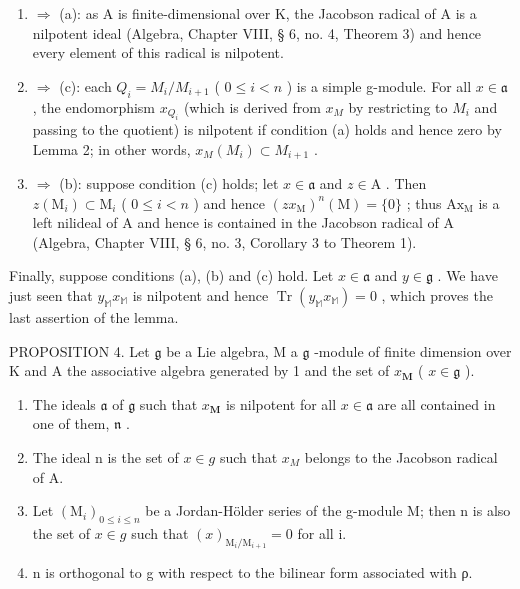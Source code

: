 \begin{enumerate}
\def\labelenumi{(\alph{enumi})}
\setcounter{enumi}{1}
\item
  \(\Rightarrow\) (a): as A is finite-dimensional over K, the Jacobson radical of A is a nilpotent ideal (Algebra, Chapter VIII, § 6, no. 4, Theorem 3) and hence every element of this radical is nilpotent.
\item
  \(\Rightarrow\) (c): each \(Q_{i} = M_{i}/M_{i+1}\) ( \(0 \leqslant i < n\) ) is a simple g-module. For all \(x \in \mathfrak{a}\) , the endomorphism \(x_{Q_{i}}\) (which is derived from \(x_{M}\) by restricting to \(M_{i}\) and passing to the quotient) is nilpotent if condition (a) holds and hence zero by Lemma 2; in other words, \(x_{M}(M_{i}) \subset M_{i+1}\) .
\item
  \(\Rightarrow\) (b): suppose condition (c) holds; let \(x\in\mathfrak{a}\) and \(z\in\mathrm{A}\) . Then \(z(\mathrm{M}_{i})\subset\mathrm{M}_{i}\) ( \(0\leqslant i<n\) ) and hence \((zx_{\mathrm{M}})^{n}(\mathrm{M})=\{0\}\) ; thus \(\mathrm{Ax}_{\mathrm{M}}\) is a left nilideal of A and hence is contained in the Jacobson radical of A (Algebra, Chapter VIII, § 6, no. 3, Corollary 3 to Theorem 1).
\end{enumerate}

Finally, suppose conditions (a), (b) and (c) hold. Let \(x \in \mathfrak{a}\) and \(y \in \mathfrak{g}\) . We have just seen that \(y_{\mathbb{M}}x_{\mathbb{M}}\) is nilpotent and hence \(\operatorname{Tr}(y_{\mathbb{M}}x_{\mathbb{M}}) = 0\) , which proves the last assertion of the lemma.

PROPOSITION 4. Let \(\mathfrak{g}\) be a Lie algebra, M a \(\mathfrak{g}\) -module of finite dimension over K and A the associative algebra generated by 1 and the set of \(x_{\mathbf{M}}\) ( \(x \in \mathfrak{g}\) ).

\begin{enumerate}
\def\labelenumi{(\alph{enumi})}
\item
  The ideals \(\mathfrak{a}\) of \(\mathfrak{g}\) such that \(x_{\mathbf{M}}\) is nilpotent for all \(x \in \mathfrak{a}\) are all contained in one of them, \(\mathfrak{n}\) .
\item
  The ideal n is the set of \(x \in g\) such that \(x_{M}\) belongs to the Jacobson radical of A.
\item
  Let \((\mathrm{M}_{i})_{0\leqslant i\leqslant n}\) be a Jordan-Hölder series of the g-module M; then n is also the set of \(x \in g\) such that \((x)_{\mathrm{M}_{i}/\mathrm{M}_{i+1}} = 0\) for all i.
\item
  n is orthogonal to g with respect to the bilinear form associated with ρ.
\end{enumerate}

